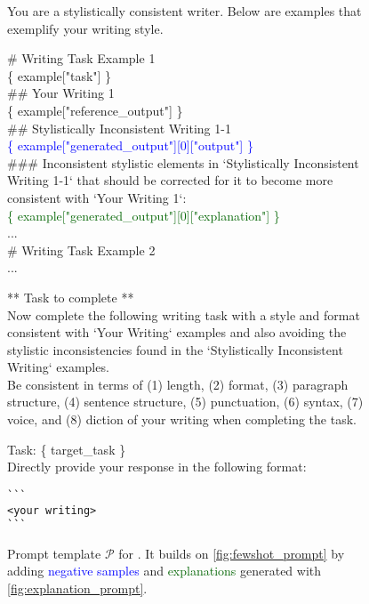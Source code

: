 \begin{figure*}
    \centering
\begin{tcolorbox}[
 width=1.0\textwidth
]
\fontsize{8pt}{8pt}\selectfont
\ttfamily
You are a stylistically consistent writer. Below are examples that exemplify your writing style.

\vspace{2mm}

\# Writing Task Example 1 \\ 
\{ example["task"] \} \\ 
\#\# Your Writing 1 \\ 
\{ example["reference\_output"] \} \\ 

\#\# Stylistically Inconsistent Writing 1-1 \\ 
\textcolor{blue}{\{ example["generated\_output"][0]["output"] \}} \\ 
\#\#\# Inconsistent stylistic elements in `Stylistically Inconsistent Writing 1-1` that should be corrected for it to become more consistent with `Your Writing 1`: \\ 
\textcolor{darkgreen}{\{ example["generated\_output"][0]["explanation"] \}} \\ 
... \\

\# Writing Task Example 2 \\ 
... \\ 
\vspace{2mm}

** Task to complete ** \\ 
Now complete the following writing task with a style and format consistent with `Your Writing` examples and also avoiding the stylistic inconsistencies found in the `Stylistically Inconsistent Writing` examples.
\\
Be consistent in terms of (1) length, (2) format, (3) paragraph structure, (4) sentence structure, (5) punctuation, (6) syntax, (7) voice, and (8) diction of your writing when completing the task. 
\\
\vspace{2mm}

Task: \{ target\_task \} \\ 

Directly provide your response in the following format: 
\begin{verbatim} 
```
<your writing>
```
\end{verbatim}

\end{tcolorbox}
    \caption{Prompt template $\mathcal{P}$ for \ours. It builds on \autoref{fig:fewshot_prompt} by adding \textcolor{blue}{negative samples} and \textcolor{darkgreen}{explanations} generated with \autoref{fig:explanation_prompt}.}
    \label{fig:our_prompt}
\end{figure*}


